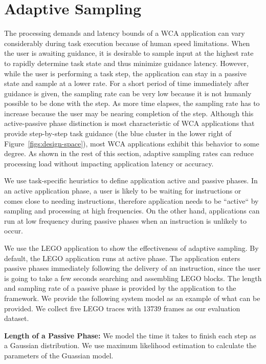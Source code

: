 \section{Adaptive Sampling}

The processing demands and latency bounds of a WCA application can
vary considerably during task execution because of human speed
limitations.  When the user is awaiting guidance, it is desirable to
sample input at the highest rate to rapidly determine task state and
thus minimize guidance latency.  However, while the user is performing
a task step, the application can stay in a passive state and sample at
a lower rate.  For a short period of time immediately after guidance
is given, the sampling rate can be very low because it is not humanly
possible to be done with the step.  As more time elapses, the
sampling rate has to increase because the user may be nearing
completion of the step.  Although this active-passive phase
distinction is most characteristic of WCA applications that provide
step-by-step task guidance (the blue cluster in
the lower right of Figure~\ref{figs:design-space}), most WCA
applications exhibit this behavior to some degree.  As shown in the
rest of this section, adaptive sampling rates can reduce processing
load without impacting application latency or accuracy.

We use task-specific heuristics to define application active and
passive phases.  In an active application phase, a user is likely to
be waiting for instructions or comes close to needing instructions,
therefore application needs to be ``active`` by sampling and
processing at high frequencies. On the other hand, applications can
run at low frequency during passive phases when an instruction is
unlikely to occur.

We use the LEGO application to show the effectiveness of adaptive
sampling. By default, the LEGO application runs at active phase. The
application enters passive phases immediately following the delivery
of an instruction, since the user is going to take a few seconds
searching and assembling LEGO blocks. The length and sampling rate of
a passive phase is provided by the application to the framework. We
provide the following system model as an example of what can be
provided. We collect five LEGO traces with 13739 frames as our
evaluation dataset.

\textbf{Length of a Passive Phase: }
We model the time it takes to finish each step as a Gaussian distribution. We
use maximum likelihood estimation to calculate the parameters of the Guassian
model.

